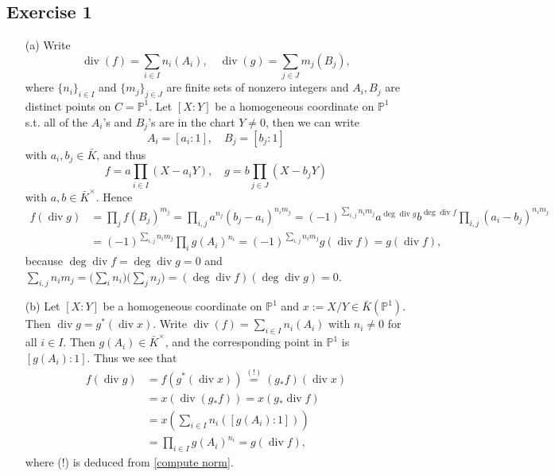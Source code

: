 \documentclass{article}
\theoremstyle{definition}
\theoremstyle{remark}
\renewcommand{\P}{\mathbb{P}}
\renewcommand{\div}{\mathop{\mathrm{div}}}
\begin{document}
\subsection*{Exercise 1}
\begin{enumerate}
    \item [(a)] Write \[\div(f) = \sum_{i\in I} n_i(A_i),\quad \div(g) = \sum_{j\in J}m_j(B_j),\]
    where $\{n_i\}_{i\in I}$ and $\{m_j\}_{j\in J}$ are finite sets of nonzero integers and $A_i, B_j$ are distinct points on $C = \P^1$.
    Let $[X : Y]$ be a homogeneous coordinate on $\P^1$ s.t. all of the $A_i$'s and $B_j$'s are in the chart $Y\ne 0$,
    then we can write \[A_i = [a_i : 1],\quad B_j = [b_j : 1]\] with $a_i, b_j\in \bar{K}$, and thus
    \[f = a\prod_{i\in I}(X-a_iY),\quad g = b\prod_{j\in J}(X-b_jY)\] with $a, b\in\bar{K}^\times$.
    Hence \begin{align*}
        f(\div g) &= \prod_j f(B_j)^{m_j}
        = \prod_{i, j}a^{n_j}(b_j-a_i)^{n_im_j}
        = (-1)^{\sum_{i, j}n_im_j}a^{\deg\div g}b^{\deg\div f}\prod_{i, j}(a_i-b_j)^{n_im_j}\\
        &= (-1)^{\sum_{i, j}n_im_j}\prod_i g(A_i)^{n_i} = (-1)^{\sum_{i, j}n_im_j}g(\div f) = g(\div f),
    \end{align*}
    because $\deg\div f = \deg\div g = 0$ and $\sum_{i, j}n_im_j = \big( \sum_in_i \big) \big( \sum_jn_j   \big) = (\deg \div f)(\deg \div g) = 0$.
    \item [(b)]
    Let $[X : Y]$ be a homogeneous coordinate on $\P^1$ and $x := X/Y\in \bar{K}(\P^1)$.
    Then $\div g = g^*(\div x)$.
    Write $\div(f) = \sum_{i\in I} n_i(A_i)$ with $n_i\ne 0$ for all $i\in I$.
    Then $g(A_i)\in \bar{K}^\times$, and the corresponding point in $\P^1$ is $[g(A_i) : 1]$.
    Thus we see that \begin{align*}
        f(\div g) &= f(g^*(\div x)) \stackrel{(!)}{=} (g_*f)(\div x)\\
        &= x(\div (g_*f))
        = x(g_*\div f) \\
        &= x\left( \sum_{i\in I}n_i ([g(A_i) : 1]) \right)\\
        &= \prod_{i\in I} g(A_i)^{n_i} = g(\div f),
    \end{align*}
    where (!) is deduced from \cref{compute norm}.
\end{enumerate}
\end{document}
